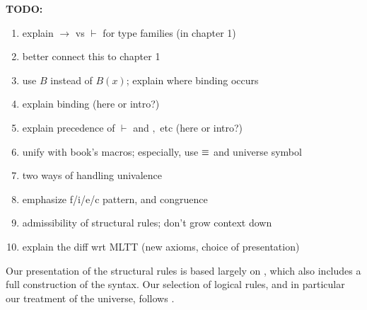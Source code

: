 \let\syn\mathsf
\newcommand{\synisHIso}{\mathsf{isHIso}}
\newcommand{\synHIso}{\mathsf{HIso}}
\newcommand{\synisEquiv}{\mathsf{isEquiv}}
\newcommand{\synEquiv}{\mathsf{Equiv}}
\newcommand{\synisAdjEquiv}{\mathsf{isAdjEquiv}}
\newcommand{\synAdjEquiv}{\mathsf{AdjEquiv}}
\newcommand{\synHEquivStrux}{\mathsf{HEquivStrux}}
\newcommand{\synHEquiv}{\mathsf{HEquiv}}
\newcommand{\synHFib}{\mathsf{hFib}}
\newcommand{\synHomLHInv}{\mathsf{HomLInv}}
\newcommand{\synHomRHInv}{\mathsf{HomRInv}}
\newcommand{\synLHInv}{\mathsf{LInv}}
\newcommand{\synRHInv}{\mathsf{RInv}}
\newcommand{\synisUnivalent}{\mathsf{isUnivalent}}
\newcommand{\synisContr}{\mathsf{isContr}}
\newcommand{\synisWEq}{\mathsf{isWEq}}
\newcommand{\synWEq}{\mathsf{WEq}}

\textbf{TODO:} 
\begin{enumerate}
\item explain $\to$ vs $\vdash$ for type families (in chapter 1)
\item better connect this to chapter 1
\item use $B$ instead of $B(x)$; explain where binding occurs
\item explain binding (here or intro?)
\item explain precedence of $\vdash$ and $,$ etc (here or intro?)
\item unify with book's macros; especially, use $\equiv$ and universe symbol
\item two ways of handling univalence
\item emphasize f/i/e/c pattern, and congruence
\item admissibility of structural rules; don't grow context down
\item explain the diff wrt MLTT (new axioms, choice of presentation)
\end{enumerate}


Our presentation of the structural rules is based largely on
\cite{hofmann:syntax-and-semantics}, which also includes a full construction of
the syntax.  Our selection of logical rules, and in particular our treatment of
the universe, follows \cite{martin-lof:bibliopolis}.

